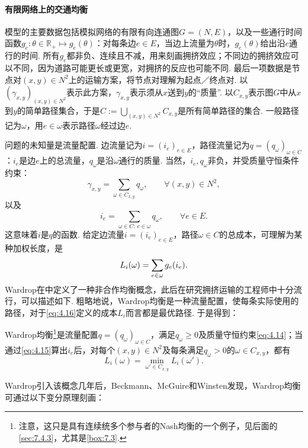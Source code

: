 \paragraph*{有限网络上的交通均衡}
\label{idx:i108-p152}
模型的主要数据包括模拟网络的有限有向连通图$G=(N,E)$，以及一些通行时间函数$g_e:\theta\in\mathbb R_+\mapsto g_e(\theta)$：对每条边$e\in E$，当边上流量为$\theta$时，$g_e(\theta)$给出沿$e$通行的时间. 所有$g_e$都非负、连续且不减，用来刻画拥挤效应；不同边的拥挤效应可以不同，因为道路可能更长或更宽，对拥挤的反应也可能不同. 最后一项数据是节点对$(x,y)\in N^2$上的运输方案，将节点对理解为起点／终点对. 以$(\gamma_{x,y})_{(x,y)\in N^2}$表示此方案，$\gamma_{x,y}$表示须从$x$送到$y$的“质量”. 以$C_{x,y}$表示图$G$中从$x$到$y$的简单路径集合，于是$C:=\bigcup_{(x,y)\in N^2}C_{x,y}$是所有简单路径的集合. 一般路径记为$\omega$，用$e\in\omega$表示路径$\omega$经过边$e$.

问题的未知量是流量配置. 边流量记为$i=(i_e)_{e\in E}$，路径流量记为$q=(q_\omega)_{\omega\in C}$：$i_e$是边$e$上的总流量，$q_\omega$是沿$\omega$通行的质量. 当然，$i_e,q_\omega$非负，并受质量守恒条件约束：
\begin{equation}\label{eq:4.14}
\gamma_{x,y}=\sum_{\omega\in C_{x,y}}q_\omega,
\qquad\forall(x,y)\in N^2,
\end{equation}
以及
\begin{equation}\label{eq:4.15}
i_e=\sum_{\omega\in C:\,e\in\omega}q_\omega,
\qquad\forall e\in E.
\end{equation}
这意味着$i$是$q$的函数. 给定边流量$i=(i_e)_{e\in E}$，路径$\omega\in C$的总成本，可理解为某种加权长度，是
\begin{equation}\label{eq:4.16}\index{G065@测地线（geodesics）!069@交通拥堵中（in traffic congestion）|hyperpage}
L_i(\omega)=\sum_{e\in\omega}g_e(i_e).
\end{equation}
Wardrop在\cite{b295}中定义了一种非合作均衡概念，此后在研究拥挤运输的工程师中十分流行，可以描述如下. 粗略地说，Wardrop均衡是一种流量配置，使每条实际使用的路径，对于\eqref{eq:4.16}定义的成本$L_i$而言都是最优路径. 于是得到：

\begin{definition}\label{obj:4.27}
Wardrop均衡\footnote{注意，这只是具有连续统多个参与者的Nash均衡的一个例子，见后面的\autoref{sec:7.4.3}，尤其是\autoref{box:7.3}.}是流量配置$q=(q_\omega)_{\omega\in C}$，满足$q_\omega\geq0$及质量守恒约束\eqref{eq:4.14}；当通过\eqref{eq:4.15}算出$i_e$后，对每个$(x,y)\in N^2$及每条满足$q_\omega>0$的$\omega\in C_{x,y}$，都有
\[
L_i(\omega)=\min_{\omega'\in C_{x,y}}L_i(\omega').
\]
\end{definition}
Wardrop引入该概念几年后，Beckmann、McGuire和Winsten\cite{b29}发现，Wardrop均衡可通过以下变分原理刻画：

